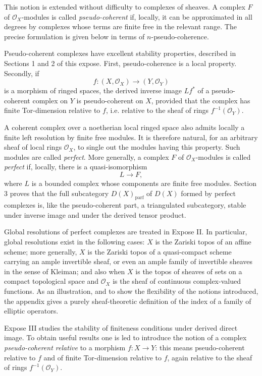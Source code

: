 \documentclass[14pt]{extarticle}
\newcommand{\cO}{\mathcal O}
\begin{document}
This notion is extended without difficulty to complexes of sheaves. A complex $F$ of $\cO_X$-modules is called \emph{pseudo-coherent} if, locally, it can be approximated in all degrees by complexes whose terms are finite free in the relevant range. The precise formulation is given below in terms of $n$-pseudo-coherence.

Pseudo-coherent complexes have excellent stability properties, described in Sections 1 and 2 of this expose. First, pseudo-coherence is a local property. Secondly, if
\[
   f:(X,\cO_X)\longrightarrow(Y,\cO_Y)
\]
is a morphism of ringed spaces, the derived inverse image $Lf^*$ of a pseudo-coherent complex on $Y$ is pseudo-coherent on $X$, provided that the complex has finite Tor-dimension relative to $f$, i.e. relative to the sheaf of rings $f^{-1}(\cO_Y)$.

A coherent complex over a noetherian local ringed space also admits locally a finite left resolution by finite free modules. It is therefore natural, for an arbitrary sheaf of local rings $\cO_X$, to single out the modules having this property. Such modules are called \emph{perfect}. More generally, a complex $F$ of $\cO_X$-modules is called \emph{perfect} if, locally, there is a quasi-isomorphism
\[
   L\longrightarrow F,
\]
where $L$ is a bounded complex whose components are finite free modules. Section 3 proves that the full subcategory $D(X)_{\mathrm{parf}}$ of $D(X)$ formed by perfect complexes is, like the pseudo-coherent part, a triangulated subcategory, stable under inverse image and under the derived tensor product.

Global resolutions of perfect complexes are treated in Expose II. In particular, global resolutions exist in the following cases: $X$ is the Zariski topos of an affine scheme; more generally, $X$ is the Zariski topos of a quasi-compact scheme carrying an ample invertible sheaf, or even an ample family of invertible sheaves in the sense of Kleiman; and also when $X$ is the topos of sheaves of sets on a compact topological space and $\cO_X$ is the sheaf of continuous complex-valued functions. As an illustration, and to show the flexibility of the notions introduced, the appendix gives a purely sheaf-theoretic definition of the index of a family of elliptic operators.

Expose III studies the stability of finiteness conditions under derived direct image. To obtain useful results one is led to introduce the notion of a complex \emph{pseudo-coherent relative} to a morphism $f:X\to Y$: this means pseudo-coherent relative to $f$ and of finite Tor-dimension relative to $f$, again relative to the sheaf of rings $f^{-1}(\cO_Y)$.
\end{document}
